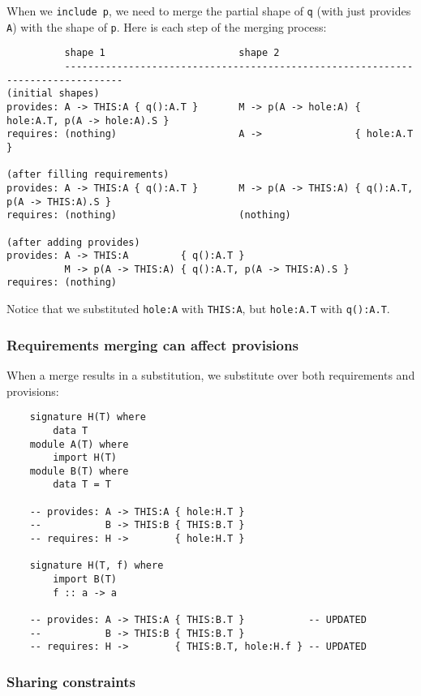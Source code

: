 \documentclass{article}
\begin{document}
When we \verb|include p|, we need to merge the partial shape
of \verb|q| (with just provides \verb|A|) with the shape
of \verb|p|.  Here is each step of the merging process:

\begin{verbatim}
          shape 1                       shape 2
          --------------------------------------------------------------------------------
(initial shapes)
provides: A -> THIS:A { q():A.T }       M -> p(A -> hole:A) { hole:A.T, p(A -> hole:A).S }
requires: (nothing)                     A ->                { hole:A.T }

(after filling requirements)
provides: A -> THIS:A { q():A.T }       M -> p(A -> THIS:A) { q():A.T, p(A -> THIS:A).S }
requires: (nothing)                     (nothing)

(after adding provides)
provides: A -> THIS:A         { q():A.T }
          M -> p(A -> THIS:A) { q():A.T, p(A -> THIS:A).S }
requires: (nothing)
\end{verbatim}

Notice that we substituted \verb|hole:A| with \verb|THIS:A|, but \verb|hole:A.T| with \verb|q():A.T|.

\subsubsection{Requirements merging can affect provisions}

When a merge results in a substitution, we substitute over both
requirements and provisions:

\begin{verbatim}
    signature H(T) where
        data T
    module A(T) where
        import H(T)
    module B(T) where
        data T = T

    -- provides: A -> THIS:A { hole:H.T }
    --           B -> THIS:B { THIS:B.T }
    -- requires: H ->        { hole:H.T }

    signature H(T, f) where
        import B(T)
        f :: a -> a

    -- provides: A -> THIS:A { THIS:B.T }           -- UPDATED
    --           B -> THIS:B { THIS:B.T }
    -- requires: H ->        { THIS:B.T, hole:H.f } -- UPDATED
\end{verbatim}

\subsubsection{Sharing constraints}
\end{document}
